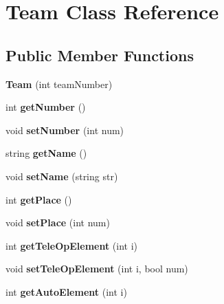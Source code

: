 \hypertarget{class_team}{}\section{Team Class Reference}
\label{class_team}
\subsection*{Public Member Functions}
\begin{DoxyCompactItemize}
\item 
\hypertarget{class_team_a3119f904a89b3806829bd49bd31b0e28}{}\label{class_team_a3119f904a89b3806829bd49bd31b0e28} 
{\bfseries Team} (int team\+Number)
\item 
\hypertarget{class_team_a76485312b881e585ccfa227710e708e8}{}\label{class_team_a76485312b881e585ccfa227710e708e8} 
int {\bfseries get\+Number} ()
\item 
\hypertarget{class_team_a8de8a2cfe74dbbb12660fe1cf462182a}{}\label{class_team_a8de8a2cfe74dbbb12660fe1cf462182a} 
void {\bfseries set\+Number} (int num)
\item 
\hypertarget{class_team_ab21736a411213da36d08210e570ecbeb}{}\label{class_team_ab21736a411213da36d08210e570ecbeb} 
string {\bfseries get\+Name} ()
\item 
\hypertarget{class_team_a6b4e344f80d411949578889098b7194b}{}\label{class_team_a6b4e344f80d411949578889098b7194b} 
void {\bfseries set\+Name} (string str)
\item 
\hypertarget{class_team_a9895de1b3518a9bb7e57d636a056b75b}{}\label{class_team_a9895de1b3518a9bb7e57d636a056b75b} 
int {\bfseries get\+Place} ()
\item 
\hypertarget{class_team_aeed30ef27240a1ee2c127619031b40cf}{}\label{class_team_aeed30ef27240a1ee2c127619031b40cf} 
void {\bfseries set\+Place} (int num)
\item 
\hypertarget{class_team_aac0ef50b17408230d4435e64e0a0c0c0}{}\label{class_team_aac0ef50b17408230d4435e64e0a0c0c0} 
int {\bfseries get\+Tele\+Op\+Element} (int i)
\item 
\hypertarget{class_team_aeecb192d3474abbebfa0582d303cd7da}{}\label{class_team_aeecb192d3474abbebfa0582d303cd7da} 
void {\bfseries set\+Tele\+Op\+Element} (int i, bool num)
\item 
\hypertarget{class_team_a655dced0629f619cca497d36adcdd1eb}{}\label{class_team_a655dced0629f619cca497d36adcdd1eb} 
int {\bfseries get\+Auto\+Element} (int i)
\item 
\hypertarget{class_team_ada705e237131e8e1e57f341f3189d217}{}\label{class_team_ada705e237131e8e1e57f341f3189d217} 

\end{DoxyCompactItemize}
